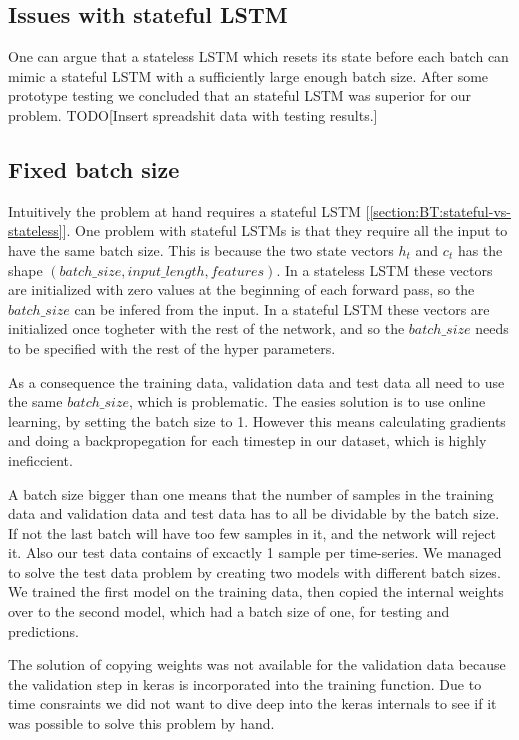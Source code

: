 
\subsection{Issues with stateful LSTM}
\label{section:Method:issues-with-stateful-lstm}
One can argue that a stateless LSTM which resets its state before each batch
can mimic a stateful LSTM with a sufficiently large enough batch size.
After some prototype testing we concluded that an stateful LSTM
was superior for our problem.
TODO[Insert spreadshit data with testing results.]

\subsection{Fixed batch size}
\label{section:Method:issues-lstm:fixed-batch-size}
Intuitively the problem at hand requires a stateful LSTM [\cref{section:BT:stateful-vs-stateless}].
One problem with stateful LSTMs is that they require all the input to have the same
batch size.
This is because the two state vectors $h_t$ and $c_t$ has the shape
$(batch\_size, input\_length, features)$. In a stateless LSTM these
vectors are initialized with zero values at the beginning of each forward pass,
so the $batch\_size$ can be infered from the input.
In a stateful LSTM these vectors are initialized once togheter with the rest
of the network, and so the $batch\_size$ needs to be specified with
the rest of the hyper parameters.

As a consequence the training data, validation data and test data all
need to use the same $batch\_size$, which is problematic.
The easies solution is to use online learning, by setting the batch size to 1.
However this means calculating gradients and doing a backpropegation for each
timestep in our dataset, which is highly ineficcient.

A batch size bigger than one means that the number of samples in
the training data and validation data and test data has to all be
dividable by the batch size. If not the last batch will have too few samples in it,
and the network will reject it.
Also our test data contains of excactly 1 sample per time-series.
We managed to solve the test data problem by creating two models with
different batch sizes. We trained the first model on the training data,
then copied the internal weights over to the second model, which had a
batch size of one, for testing and
predictions.

The solution of copying weights was not available for the validation data
because the validation step in keras is incorporated into the training function.
Due to time consraints we did not want to dive deep into the keras internals
to see if it was possible to solve this problem by hand.

